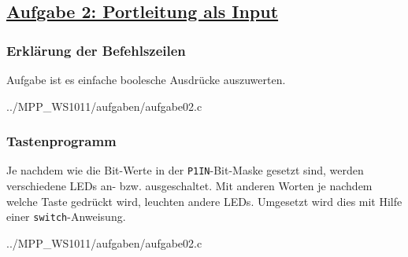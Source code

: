 \subsection*
{\href{http://cst.mi.fu-berlin.de/intern/19606-P-MPP/Aufgaben/040102.html}
{Aufgabe 2: Portleitung als Input}}

\subsubsection*{Erklärung der Befehlszeilen}
Aufgabe ist es einfache boolesche Ausdrücke auszuwerten.

{../MPP_WS1011/aufgaben/aufgabe02.c}

\subsubsection*{Tastenprogramm}
Je nachdem wie die Bit-Werte in der \texttt{P1IN}-Bit-Maske gesetzt sind, werden verschiedene LEDs an- bzw. ausgeschaltet. Mit anderen Worten je nachdem welche Taste gedrückt wird, leuchten andere LEDs.
Umgesetzt wird dies mit Hilfe einer \texttt{switch}-Anweisung.

{../MPP_WS1011/aufgaben/aufgabe02.c}
